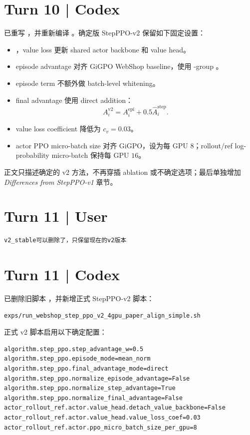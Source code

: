 \documentclass[10pt]{ctexart}
\begin{document}
\section*{Turn 10 | Codex}
已重写 ，并重新编译 。确定版 StepPPO-v2 保留如下固定设置：
\begin{itemize}
\item {}，value loss 更新 shared actor backbone 和 value head。
\item episode advantage 对齐 GiGPO WebShop baseline，使用 -group 。
\item episode term 不额外做 batch-level whitening。
\item final advantage 使用 direct addition：
\[
A_i^{\mathrm{v2}}=A_i^{\mathrm{epi}}+0.5\widehat A_i^{\mathrm{step}}.
\]
\item value loss coefficient 降低为 $c_v=0.03$。
\item actor PPO micro-batch size 对齐 GiGPO，设为每 GPU $8$；rollout/ref log-probability micro-batch 保持每 GPU $16$。
\end{itemize}
正文只描述确定的 v2 方法，不再穿插 ablation 或不确定选项；最后单独增加 \textit{Differences from StepPPO-v1} 章节。

\section*{Turn 11 | User}
\begin{Verbatim}[breaklines=true,breakanywhere=true]
v2_stable可以删除了，只保留现在的v2版本
\end{Verbatim}

\section*{Turn 11 | Codex}
已删除旧脚本 ，并新增正式 StepPPO-v2 脚本：
\begin{Verbatim}[breaklines=true,breakanywhere=true]
exps/run_webshop_step_ppo_v2_4gpu_paper_align_simple.sh
\end{Verbatim}

正式 v2 脚本启用以下确定配置：
\begin{Verbatim}[breaklines=true,breakanywhere=true]
algorithm.step_ppo.step_advantage_w=0.5
algorithm.step_ppo.episode_mode=mean_norm
algorithm.step_ppo.final_advantage_mode=direct
algorithm.step_ppo.normalize_episode_advantage=False
algorithm.step_ppo.normalize_step_advantage=True
algorithm.step_ppo.normalize_final_advantage=False
actor_rollout_ref.actor.value_head.detach_value_backbone=False
actor_rollout_ref.actor.value_head.value_loss_coef=0.03
actor_rollout_ref.actor.ppo_micro_batch_size_per_gpu=8
\end{Verbatim}
\end{document}
